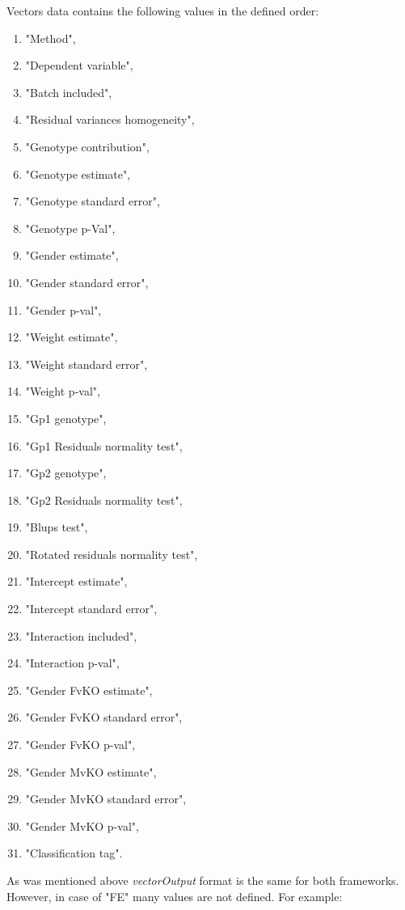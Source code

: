 \documentclass[12pt,a4paper]{article}
\begin{document}
Vectors data contains the following values in the defined order:
\begin{enumerate}
 \item "Method", 
 \item "Dependent variable",
 \item "Batch included",
 \item "Residual variances homogeneity",
 \item "Genotype contribution",
 \item "Genotype estimate",
 \item "Genotype standard error",
 \item "Genotype p-Val",
 \item "Gender estimate",
 \item "Gender standard error",
 \item "Gender p-val", 
 \item "Weight estimate",
 \item "Weight standard error",
 \item "Weight p-val",
 \item "Gp1 genotype",
 \item "Gp1 Residuals normality test", 
 \item "Gp2 genotype",
 \item "Gp2 Residuals normality test",
 \item "Blups test",
 \item "Rotated residuals normality test", 
 \item "Intercept estimate",
 \item "Intercept standard error",
 \item "Interaction included",
 \item "Interaction p-val",
 \item "Gender FvKO estimate",
 \item "Gender FvKO standard error",
 \item "Gender FvKO p-val",
 \item "Gender MvKO estimate",
 \item "Gender MvKO standard error",
 \item "Gender MvKO p-val",
 \item "Classification tag".
\end{enumerate}


As was mentioned above \textit{vectorOutput} format is the same for both frameworks. However, in case of "FE" many values are not defined. For example:
\end{document}

